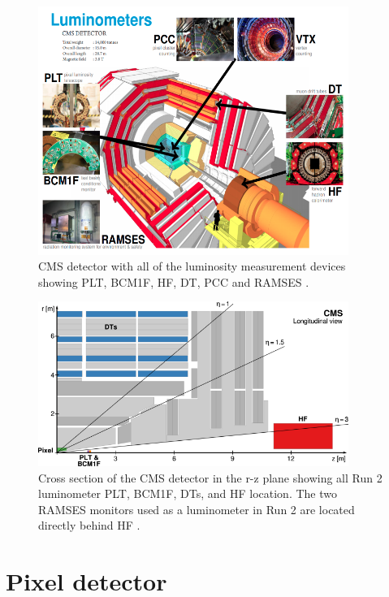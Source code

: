 \begin{figure}[!htp]
\centering
\includegraphics[width=0.9\textwidth]{ashish_thesis/luminometer_cms.png}
\caption[CMS Luminometers]{%
   CMS detector with all of the luminosity measurement devices showing PLT, BCM1F, HF, DT, PCC and RAMSES \cite{meyer2021luminosity}. 
}
\label{fig:lumino_cms}
\end{figure}


\begin{figure}[!htp]
\centering
\includegraphics[width=0.9\textwidth]{ashish_thesis/luminometer_cms_pseudo.png}
\caption[CMS luminometers Location]{%
    Cross section of the CMS detector in the r-z plane showing all Run 2 luminometer PLT, BCM1F, DTs, and HF location. The two RAMSES monitors used as a luminometer in Run 2 are located directly behind HF \cite{Sirunyan:2759951}. 
}
\label{fig:lumino_cms_pseudo}
\end{figure}

\section{Pixel detector}

